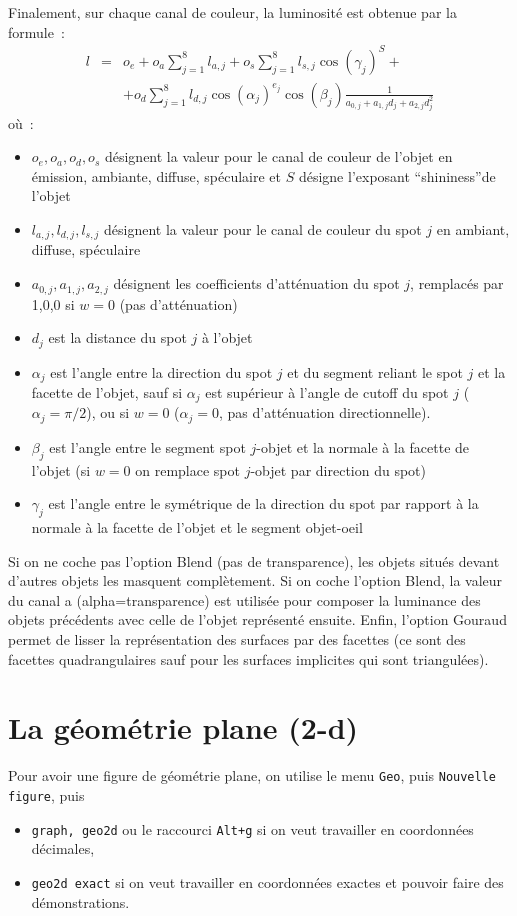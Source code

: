 \documentclass[a4paper,11pt]{article}
\begin{document}
Finalement, sur chaque canal de couleur, la luminosit\'e est obtenue par
la formule~:
\begin{eqnarray*}
 l &=&o_e+ o_a \sum_{j=1}^8 l_{a,j} + o_s \sum_{j=1}^8 l_{s,j}
 \cos(\gamma_j)^S + \\
 &  & +  o_d \sum_{j=1}^8 l_{d,j} 
\cos(\alpha_j)^{e_j} \cos(\beta_j) \frac{1}{a_{0,j}+a_{1,j}
  d_j+a_{2,j} d_j^2} 
\end{eqnarray*}
o\`u~:
\begin{itemize}
\item $o_e,o_a,o_d,o_s$ d\'esignent la valeur pour le canal de couleur
de l'objet en \'emission, ambiante, diffuse, sp\'eculaire et $S$ d\'esigne
l'exposant ``shininess''de l'objet
\item $l_{a,j},l_{d,j},l_{s,j}$ d\'esignent la valeur pour le canal de couleur
du spot $j$ en ambiant, diffuse, sp\'eculaire
\item $a_{0,j}, a_{1,j}, a_{2,j}$ d\'esignent les coefficients
  d'att\'enuation du spot $j$, remplac\'es par 1,0,0 si $w=0$ (pas
d'att\'enuation)
\item $d_j$ est la distance du spot $j$ \`a l'objet
\item $\alpha_j$ est l'angle entre la direction du spot $j$ et du
segment reliant le spot $j$ et la facette de l'objet, sauf si $\alpha_j$ est
sup\'erieur \`a l'angle de cutoff du spot $j$ ($\alpha_j=\pi/2$), 
ou si $w=0$ ($\alpha_j=0$, pas d'att\'enuation directionnelle).
\item $\beta_j$ est l'angle entre le segment spot $j$-objet et
la normale \`a la facette de l'objet (si $w=0$ on remplace spot $j$-objet par
direction du spot)
\item $\gamma_j$ est l'angle entre le sym\'etrique de la direction 
du spot par rapport \`a la normale \`a la facette de l'objet 
et le segment objet-oeil
\end{itemize}
Si on ne coche pas l'option Blend (pas de transparence), les objets
situ\'es devant d'autres objets les masquent compl\`etement.
Si on coche l'option Blend, la valeur du canal a (alpha=transparence)
est utilis\'ee pour composer la luminance des objets pr\'ec\'edents avec
celle de l'objet repr\'esent\'e ensuite.
Enfin, l'option Gouraud permet de lisser la repr\'esentation des
surfaces par des facettes (ce sont des facettes quadrangulaires
sauf pour les surfaces implicites qui sont triangul\'ees).

\section{La g\'eom\'etrie plane (2-d)}
Pour avoir une figure de g\'eom\'etrie plane, on utilise le menu 
{\tt Geo}, puis {\tt Nouvelle figure}, puis
\begin{itemize}
\item  {\tt graph, geo2d} ou le raccourci {\tt Alt+g} si on 
veut travailler en coordonn\'ees d\'ecimales,
\item {\tt  geo2d exact} si on veut travailler en coordonn\'ees  exactes et pouvoir faire des d\'emonstrations.
\end{itemize}
\end{document}
